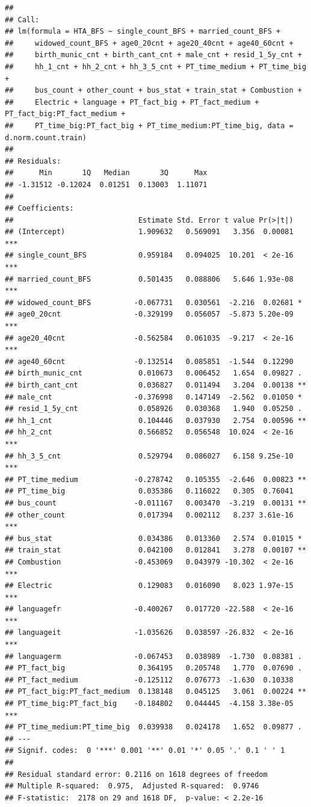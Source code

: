 \documentclass[
]{article}
\begin{document}
\begin{verbatim}
## 
## Call:
## lm(formula = HTA_BFS ~ single_count_BFS + married_count_BFS + 
##     widowed_count_BFS + age0_20cnt + age20_40cnt + age40_60cnt + 
##     birth_munic_cnt + birth_cant_cnt + male_cnt + resid_1_5y_cnt + 
##     hh_1_cnt + hh_2_cnt + hh_3_5_cnt + PT_time_medium + PT_time_big + 
##     bus_count + other_count + bus_stat + train_stat + Combustion + 
##     Electric + language + PT_fact_big + PT_fact_medium + PT_fact_big:PT_fact_medium + 
##     PT_time_big:PT_fact_big + PT_time_medium:PT_time_big, data = d.norm.count.train)
## 
## Residuals:
##      Min       1Q   Median       3Q      Max 
## -1.31512 -0.12024  0.01251  0.13003  1.11071 
## 
## Coefficients:
##                             Estimate Std. Error t value Pr(>|t|)    
## (Intercept)                 1.909632   0.569091   3.356  0.00081 ***
## single_count_BFS            0.959184   0.094025  10.201  < 2e-16 ***
## married_count_BFS           0.501435   0.088806   5.646 1.93e-08 ***
## widowed_count_BFS          -0.067731   0.030561  -2.216  0.02681 *  
## age0_20cnt                 -0.329199   0.056057  -5.873 5.20e-09 ***
## age20_40cnt                -0.562584   0.061035  -9.217  < 2e-16 ***
## age40_60cnt                -0.132514   0.085851  -1.544  0.12290    
## birth_munic_cnt             0.010673   0.006452   1.654  0.09827 .  
## birth_cant_cnt              0.036827   0.011494   3.204  0.00138 ** 
## male_cnt                   -0.376998   0.147149  -2.562  0.01050 *  
## resid_1_5y_cnt              0.058926   0.030368   1.940  0.05250 .  
## hh_1_cnt                    0.104446   0.037930   2.754  0.00596 ** 
## hh_2_cnt                    0.566852   0.056548  10.024  < 2e-16 ***
## hh_3_5_cnt                  0.529794   0.086027   6.158 9.25e-10 ***
## PT_time_medium             -0.278742   0.105355  -2.646  0.00823 ** 
## PT_time_big                 0.035386   0.116022   0.305  0.76041    
## bus_count                  -0.011167   0.003470  -3.219  0.00131 ** 
## other_count                 0.017394   0.002112   8.237 3.61e-16 ***
## bus_stat                    0.034386   0.013360   2.574  0.01015 *  
## train_stat                  0.042100   0.012841   3.278  0.00107 ** 
## Combustion                 -0.453069   0.043979 -10.302  < 2e-16 ***
## Electric                    0.129083   0.016090   8.023 1.97e-15 ***
## languagefr                 -0.400267   0.017720 -22.588  < 2e-16 ***
## languageit                 -1.035626   0.038597 -26.832  < 2e-16 ***
## languagerm                 -0.067453   0.038989  -1.730  0.08381 .  
## PT_fact_big                 0.364195   0.205748   1.770  0.07690 .  
## PT_fact_medium             -0.125112   0.076773  -1.630  0.10338    
## PT_fact_big:PT_fact_medium  0.138148   0.045125   3.061  0.00224 ** 
## PT_time_big:PT_fact_big    -0.184802   0.044445  -4.158 3.38e-05 ***
## PT_time_medium:PT_time_big  0.039938   0.024178   1.652  0.09877 .  
## ---
## Signif. codes:  0 '***' 0.001 '**' 0.01 '*' 0.05 '.' 0.1 ' ' 1
## 
## Residual standard error: 0.2116 on 1618 degrees of freedom
## Multiple R-squared:  0.975,  Adjusted R-squared:  0.9746 
## F-statistic:  2178 on 29 and 1618 DF,  p-value: < 2.2e-16
\end{verbatim}
\end{document}

